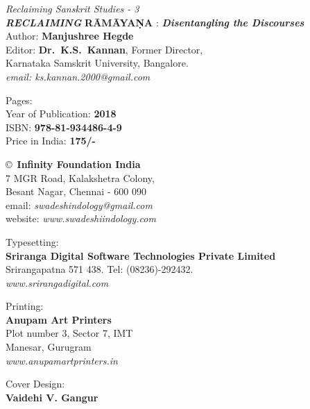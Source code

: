 \thispagestyle{empty}
\noindent
{\fontsize{9}{11}\selectfont\sl Reclaiming Sanskrit Studies - 3}\\
{\sl\bfseries RECLAIMING} {\bf RĀMĀYAṆA} : {\sl\bfseries Disentangling the Discourses}\\[1pt] 
Author: {\bf Manjushree Hegde}\\[9pt]
Editor: {\bf Dr.\ K.S.\ Kannan}, Former Director,\\ 
Karnataka Samskrit University, Bangalore.\\
{\sl email: ks.kannan.2000@gmail.com}
\vfill

\noindent
Pages: {\bf \pageref{bookend}}\\
Year of Publication: {\bf 2018}\\
ISBN: {\bf 978-81-934486-4-9}\\
Price in India: {\bf 175/-}
\vfill

\noindent
\copyright\ {\bf Infinity Foundation India}\\ 
7 MGR Road, Kalakshetra Colony,\\ 
Besant Nagar, Chennai - 600 090\\
email: {\sl swadeshindology@gmail.com}\\
website: {\sl www.swadeshiindology.com} 
\vfill

\noindent
Typesetting:\\
{\bf Sriranga Digital Software Technologies Private Limited}\\ 
Srirangapatna 571 438. Tel: (08236)-292432.\\
{\sl www.srirangadigital.com}\\

\vfill

\noindent
Printing:\\
{\bf Anupam Art Printers}\\
Plot number 3, Sector 7, IMT\\
Manesar, Gurugram\\
{\sl www.anupamartprinters.in}

\vfill
\noindent
Cover Design:\\
{\bf Vaidehi V. Gangur}
